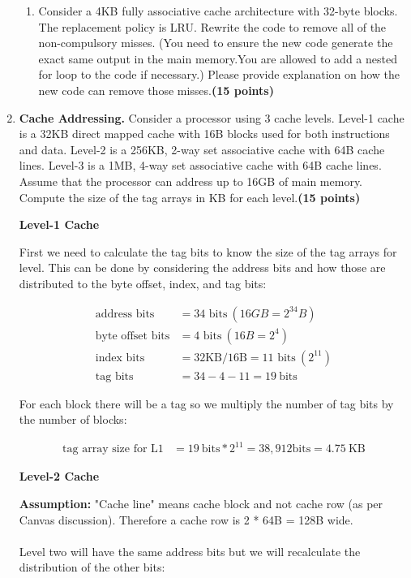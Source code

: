 \documentclass[a4paper, 11pt]{exam}
\begin{document}
\begin{enumerate}
\begin{enumerate}
\item Consider a 4KB fully associative cache architecture with 32-byte blocks. The replacement policy is LRU. Rewrite the code to remove  all of the non-compulsory misses. (You need to ensure the new code generate the exact same output in the main memory.You are allowed to add a nested for loop to the code if necessary.) Please provide explanation on how the new code can remove those misses.\textbf{(15 points)}


\end{enumerate}



\item \textbf {Cache Addressing.} Consider a processor using 3 cache levels. Level-1 cache is a
32KB direct mapped cache with 16B blocks used for both instructions and data. Level-2 is a
256KB, 2-way set associative cache with 64B cache lines. Level-3 is a
1MB, 4-way set associative cache with 64B cache lines. Assume that the processor can
address up to 16GB of main memory.  Compute the size of the tag arrays in KB for each level.\textbf{(15 points)}


\textbf{Level-1 Cache}

First we need to calculate the tag bits to know the size of the tag arrays for level. This can be done by considering the address bits and how those are distributed to the byte offset, index, and tag bits:

\begin{align*}
\text{address bits} &= \text{34 bits} \  (16GB = 2^{34} B) \\
\text{byte offset bits} &= \text{4 bits} \ (16B = 2^4) \\
\text{index bits} &= \text{32KB/16B} = \text{11 bits} \ (2^{11})\\
\text{tag bits} &= 34 - 4 - 11 = 19 \ \text{bits}         
\end{align*}

For each block there will be a tag so we multiply the number of tag bits by the number of blocks:

\begin{align*}
\text{tag array size for L1} &= 19 \ \text{bits} * 2^{11} = 38, 912 \text{bits} = 4.75 \ \text{KB} 	
\end{align*}

\textbf{Level-2 Cache}

\textbf{Assumption:} "Cache line" means cache block and not cache row (as per Canvas discussion). Therefore a cache row is 2 * 64B = 128B wide.\\ \\
Level two will have the same address bits but we will recalculate the distribution of the other bits:


\end{enumerate}
\end{document}
